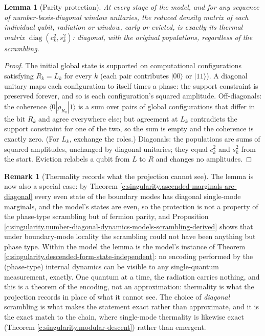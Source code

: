 \documentclass[11pt]{article}
\newtheorem{lemma}[theorem]{Lemma}
\theoremstyle{definition}
\newtheorem{remark}[theorem]{Remark}
\theoremstyle{plain}
\begin{document}
\begin{lemma}[Parity protection]\label{c:singularity.parity-protection}
At every stage of the model, and for \emph{any} sequence of number-basis-diagonal window unitaries, the reduced density matrix of each individual qubit, radiation or window, early or evicted, is exactly its thermal matrix $\operatorname{diag}(c_k^2, s_k^2)$: diagonal, with the original populations, regardless of the scrambling.
\end{lemma}
\begin{proof}
The initial global state is supported on computational configurations satisfying $R_k = L_k$ for every $k$ (each pair contributes $|00\rangle$ or $|11\rangle$). A diagonal unitary maps each configuration to itself times a phase: the support constraint is preserved forever, and so is each configuration's squared amplitude. Off-diagonals: the coherence $\langle 0|\rho_{R_k}|1\rangle$ is a sum over pairs of global configurations that differ in the bit $R_k$ and agree everywhere else; but agreement at $L_k$ contradicts the support constraint for one of the two, so the sum is empty and the coherence is exactly zero. (For $L_k$, exchange the roles.) Diagonals: the populations are sums of squared amplitudes, unchanged by diagonal unitaries; they equal $c_k^2$ and $s_k^2$ from the start. Eviction relabels a qubit from $L$ to $R$ and changes no amplitudes.

\end{proof}

\begin{remark}[Thermality records what the projection cannot see]\label{c:note.singularity.thermality-records-what-projection-cannot-see}
The lemma is now also a special case: by Theorem \ref{c:singularity.ascended-marginals-are-diagonal} every even state of the boundary modes has diagonal single-mode marginals, and the model's states are even, so the protection is not a property of the phase-type scrambling but of fermion parity, and Proposition \ref{c:singularity.number-diagonal-dynamics-models-scrambling-derived} shows that under boundary-mode locality the scrambling could not have been anything but phase type. Within the model the lemma is the model's instance of Theorem \ref{c:singularity.descended-form-state-independent}: no encoding performed by the (phase-type) internal dynamics can be visible to any single-quantum measurement, exactly. One quantum at a time, the radiation carries nothing, and this is a theorem of the encoding, not an approximation: thermality is what the projection records in place of what it cannot see. The choice of \emph{diagonal} scrambling is what makes the statement exact rather than approximate, and it is the exact match to the chain, where single-mode thermality is likewise exact (Theorem \ref{c:singularity.modular-descent}) rather than emergent.
\end{remark}
\end{document}
